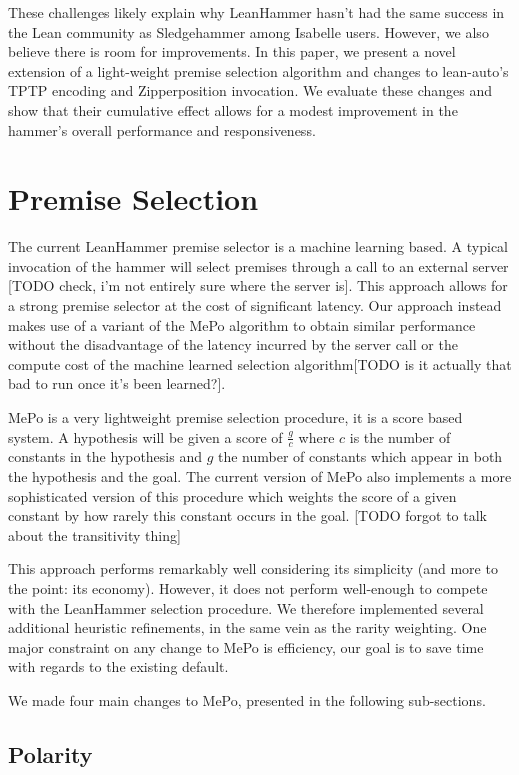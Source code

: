 \documentclass[runningheads]{llncs}
\begin{document}
These challenges likely explain why LeanHammer hasn't had the same success in the Lean community as Sledgehammer among Isabelle users. However, we also believe there is room for improvements. In this paper, we present a novel extension of a light-weight premise selection algorithm and changes to lean-auto's TPTP encoding and Zipperposition invocation. We evaluate these changes and show that their cumulative effect allows for a modest improvement in the hammer's overall performance and responsiveness.

\section{Premise Selection}

The current LeanHammer premise selector is a machine learning based. A typical invocation of the hammer will select premises through a call to an external server [TODO check, i'm not entirely sure where the server is]. This approach allows for a strong premise selector at the cost of significant latency. Our approach instead makes use of a variant of the MePo algorithm to obtain similar performance without the disadvantage of the latency incurred by the server call or the compute cost of the machine learned selection algorithm[TODO is it actually that bad to run once it's been learned?].

MePo is a very lightweight premise selection procedure, it is a score based system. A hypothesis will be given a score of \(\frac{g}{c}\) where \(c\) is the number of constants in the hypothesis and \(g\) the number of constants which appear in both the hypothesis and the goal. The current version of MePo also implements a more sophisticated version of this procedure which weights the score of a given constant by how rarely this constant occurs in the goal. [TODO forgot to talk about the transitivity thing]

This approach performs remarkably well considering its simplicity (and more to the point: its economy). However, it does not perform well-enough to compete with the LeanHammer selection procedure. We therefore implemented several additional heuristic refinements, in the same vein as the rarity weighting. One major constraint on any change to MePo is efficiency, our goal is to save time with regards to the existing default. 

We made four main changes to MePo, presented in the following sub-sections.

\subsection{Polarity}
\end{document}
